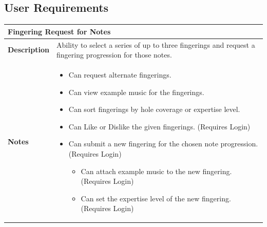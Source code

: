 \documentclass[12pt,english]{article}
\providecommand{\tabularnewline}{\\}
\begin{document}
\subsection{User Requirements}
\begin{tabular}{|p{3cm}|p{13cm}|}
	\hline 
	\multicolumn{2}{|l|}{\textbf{Fingering Request for Notes}}\tabularnewline
	\hline 
	\textbf{Description}  & Ability to select a series of up to three fingerings and request a
		fingering progression for those notes. \tabularnewline
	\hline 
	\textbf{Notes}  & 
		\begin{itemize}
			\item Can request alternate fingerings. 
			\item Can view example music for the fingerings. 
			\item Can sort fingerings by hole coverage or expertise level. 
			\item Can \textquotedbl{}Like\textquotedbl{} or \textquotedbl{}Dislike\textquotedbl{}
				the given fingerings. (Requires Login) 
			\item Can submit a new fingering for the chosen note progression. (Requires Login) 
			\begin{itemize}
				\item Can attach example music to the new fingering. (Requires Login) 
				\item Can set the expertise level of the new fingering. (Requires Login)
			\end{itemize}
		\end{itemize}
	\tabularnewline
	\hline 
\end{tabular}\\[0.5cm]
\end{document}
